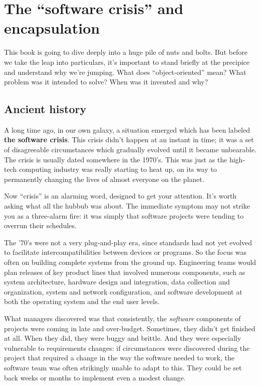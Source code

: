 
\chapter{The ``software crisis'' and encapsulation}

This book is going to dive deeply into a huge pile of nuts and bolts. But
before we take the leap into particulars, it's important to stand briefly at
the precipice and understand why we're jumping. What does ``object-oriented''
mean? What problem was it intended to solve? When was it invented and why?

\section{Ancient history}

A long time ago, in our own galaxy, a situation emerged which has been labeled
\textbf{the software crisis}. This crisis didn't happen at an instant in time;
it was a set of disagreeable circumstances which gradually evolved until it
became unbearable. The crisis is usually dated somewhere in the 1970's. This
was just as the high-tech computing industry was really starting to heat up,
on its way to permanently changing the lives of almost everyone on the planet.

Now ``crisis'' is an alarming word, designed to get your attention. It's worth
asking what all the hubbub was about. The immediate symptom may not strike you
as a three-alarm fire: it was simply that software projects were tending to
overrun their schedules.

The '70's were not a very plug-and-play era, since standards had not yet
evolved to facilitate intercompatibilities between devices or programs. So the
focus was often on building complete systems from the ground up. Engineering
teams would plan releases of key product lines that involved numerous
components, such as system architecture, hardware design and integration, data
collection and organization, system and network configuration, and software
development at both the operating system and the end user levels.

What managers discovered was that consistently, the \textit{software}
components of projects were coming in late and over-budget. Sometimes, they
didn't get finished at all. When they did, they were buggy and brittle. And
they were especially vulnerable to requirements changes: if circumstances were
discovered during the project that required a change in the way the software
needed to work, the software team was often strikingly unable to adapt to
this. They could be set back weeks or months to implement even a modest
change.

